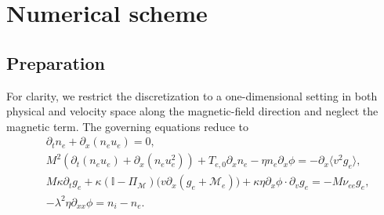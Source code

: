 \documentclass[pdflatex,final,10pt]{article}
\newcommand{\Del}[1]{#1}
\begin{document}

\section{Numerical scheme}
\subsection{Preparation}
For clarity, we restrict the discretization to a one-dimensional setting in both physical and velocity space along the magnetic-field direction and neglect the magnetic term. The governing equations reduce to
\begin{align}
    &\partial_{t}{n_e}+\partial_{x}(n_e u_e)=0,\label{12}\\
    &M^{2}(\partial_{t}(n_e u_e)+\partial_{x}(n_e u_e^2))+T_{e,0}\partial_{x}n_e-\eta n_e\partial_{x}\phi= -\partial_{x}\langle v^2  g_{e}\rangle,\label{13}\\
    &\Del{M\kappa\partial_t{g_e}+\kappa(\mathbb{I}-\Pi_{\mathcal{M}})\big(v\partial_x(g_e+\mathcal{M}_{e})\big)+\kappa\eta \partial_x\phi\cdot\partial_vg_e=-M\nu_{ee}g_e%
    ,}\label{14}\\
    &-\lambda^{2}\eta\partial_{xx}\phi=n_{i}-n_e.\label{15}
\end{align}
%
%
\end{document}
